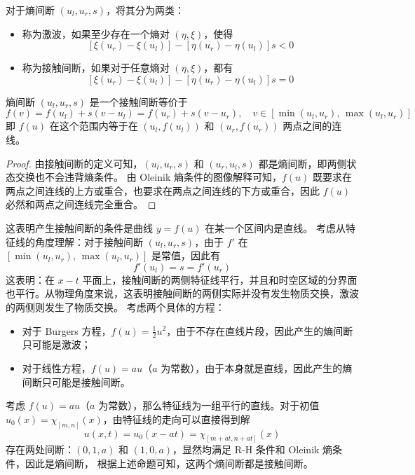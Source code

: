 \begin{definition}
    对于熵间断 $(u_l,u_r,s)$，将其分为两类：
    \begin{itemize}
        \item 称为激波，如果至少存在一个熵对 $(\eta,\xi)$，使得
              \[
                  \left[\xi(u_r) - \xi(u_l)\right] - \left[\eta(u_r) - \eta(u_l)\right] s < 0
              \]
        \item 称为接触间断，如果对于任意熵对 $(\eta,\xi)$，都有
              \[
                  \left[\xi(u_r) - \xi(u_l)\right] - \left[\eta(u_r) - \eta(u_l)\right] s = 0
              \]
    \end{itemize}
\end{definition}

\begin{theorem}
    熵间断 $(u_l,u_r,s)$ 是一个接触间断等价于
    \[
        f(v) = f(u_l) + s(v - u_l) = f(u_r) + s(v - u_r), \quad v \in [\min(u_l, u_r),\,\max(u_l, u_r)]
    \]
    即 $f(u)$ 在这个范围内等于在 $(u_l,f(u_l))$ 和 $(u_r,f(u_r))$ 两点之间的连线。
\end{theorem}

\begin{proof}
    由接触间断的定义可知，$(u_l,u_r,s)$ 和 $(u_r,u_l,s)$ 都是熵间断，即两侧状态交换也不会违背熵条件。
    由 Oleinik 熵条件的图像解释可知，$f(u)$ 既要求在两点之间连线的上方或重合，也要求在两点之间连线的下方或重合，因此 $f(u)$ 必然和两点之间连线完全重合。
\end{proof}

这表明产生接触间断的条件是曲线 $y=f(u)$ 在某一个区间内是直线。
考虑从特征线的角度理解：对于接触间断 $(u_l,u_r,s)$，由于 $f'$ 在 $[\min(u_l, u_r),\,\max(u_l, u_r)]$ 是常值，因此有
\[
    f'(u_l) = s = f'(u_r)
\]
这表明：在 $x\!-\!t$ 平面上，接触间断的两侧特征线平行，并且和时空区域的分界面也平行。从物理角度来说，这表明接触间断的两侧实际并没有发生物质交换，激波的两侧则发生了物质交换。
考虑两个具体的方程：
\begin{itemize}
    \item 对于 Burgers 方程，$f(u) = \frac12 u^2$，由于不存在直线片段，因此产生的熵间断只可能是激波；
    \item 对于线性方程，$f(u) = a u$（$a$ 为常数），由于本身就是直线，因此产生的熵间断只可能是接触间断。
\end{itemize}

\begin{example}
    考虑 $f(u) = a u$（$a$ 为常数），那么特征线为一组平行的直线。对于初值 $u_0(x) = \chi_{[m,n]}(x)$，由特征线的走向可以直接得到解
    \[
        u(x,t) = u_0(x - a t) = \chi_{[m+at,n+at]}(x)
    \]
    存在两处间断：$(0,1,a)$ 和 $(1,0,a)$，显然均满足 R-H 条件和 Oleinik 熵条件，因此是熵间断，
    根据上述命题可知，这两个熵间断都是接触间断。
\end{example}


